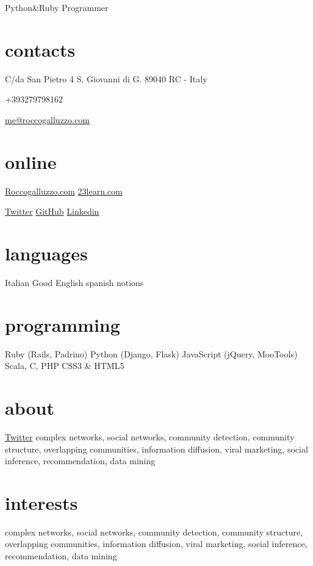 \documentclass[print]{cv}
\begin{document}
       {Python\&Ruby Programmer}



\begin{aside}\section{contacts}
    C/da San Pietro 4
    S. Giovanni di G. 
89040 RC - Italy\par\smallskip
+393279798162\par\smallskip
	\href{mailto:me@roccogalluzzo.com}{me@roccogalluzzo.com}
	\section{online}
	{\href{http://roccogalluzzo.com}{Roccogalluzzo.com}}
           \href{http://23learn.com}{23learn.com}\par\smallskip
	\href{http://twitter.com/byterussian}{Twitter}
           \href{https://github.com/byterussian}{GitHub}
           \href{http://www.linkedin.com/in/roccogalluzzo}{Linkedin}
  \section{languages}
    Italian
    Good English 
    spanish notions
  \section{programming}
    Ruby
    (Rails, Padrino)
    Python
    (Django, Flask)
    JavaScript
    (jQuery, MooTools)
    Scala, C, PHP
    CSS3 \& HTML5
\end{aside}

\section{about}
\href{http://twitter.com/byterussian}{Twitter}
complex networks, social networks, community detection, community structure,
overlapping communities, information diffusion, viral marketing, social
inference, recommendation, data mining

\section{interests}

complex networks, social networks, community detection, community structure,
overlapping communities, information diffusion, viral marketing, social
inference, recommendation, data mining
\end{document}
